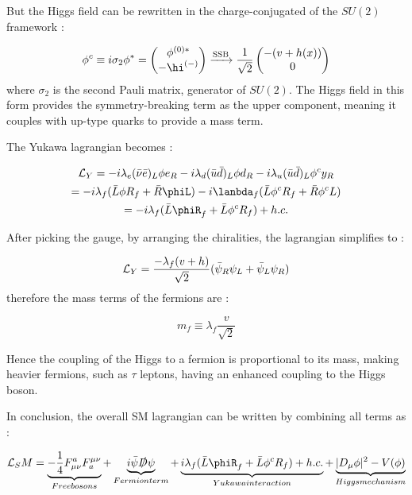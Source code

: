 But the Higgs field can be rewritten in the charge-conjugated of the $SU(2)$ framework :

\begin{equation}
    \phi^c \equiv i\sigma_2 \phi^* = \begin{pmatrix} \phi^{(0)*} \\ -\hi^{(-)} \end{pmatrix}  \xrightarrow{\text{SSB}} \frac{1}{\sqrt{2}}\begin{pmatrix} -(v+h(x)) \\ 0 \end{pmatrix} 
\end{equation}
where $\sigma_2$ is the second Pauli matrix, generator of $SU(2)$. The Higgs field in this form provides the symmetry-breaking term as the upper component, meaning it couples with up-type quarks to provide a mass term.

The Yukawa lagrangian becomes :

\begin{multline}
    \Lagr_Y = -i\lambda_e (\Bar{\nu}\Bar{e})_L \phi e_R - i\lambda_d (\Bar{u}\Bar{d})_L \phi d_R - i\lambda_u (\Bar{u}\Bar{d})_L \phi^c y_R \\ =-i\lambda_f (\Bar{L}\phi R_f + \Bar{R}\phiL) - i\lanbda_f(\Bar{L}\phi^c R_f + \Bar{R}\phi^c L) \\ = -i\lambda_f(\Bar{L}\phiR_f + \Bar{L}\phi^cR_f) + h.c.
\end{multline}

After picking the gauge, by arranging the chiralities, the lagrangian simplifies to :

\begin{equation}
    \mathcal{L}_Y = \frac{-\lambda_f (v+h)}{\sqrt{2}}(\Bar{\psi}_R\psi_L + \Bar{\psi}_L\psi_R)
\end{equation}
therefore the mass terms of the fermions are :

\begin{equation}
    m_f \equiv \lambda_f \frac{v}{\sqrt{2}}
\end{equation}

Hence the coupling of the Higgs to a fermion is proportional to its mass, making heavier fermions, such as $\tau$ leptons, having an enhanced coupling to the Higgs boson.

In conclusion, the overall SM lagrangian can be written by combining all terms as :

\begin{equation}
    \Lagr_SM = \underbrace{- \frac{1}{4} F_{\mu\nu}^a F^{\mu\nu}_a}_{Free bosons} + \underbrace{i\Bar{\psi}\slashed{D}\psi}_{Fermion term} +\underbrace{i\lambda_f(\Bar{L}\phiR_f + \Bar{L}\phi^cR_f) + h.c.}_{Yukawa interaction} + \underbrace{|D_{\mu}\phi|^2 - V(\phi)}_{Higgs mechanism}
\end{equation}

